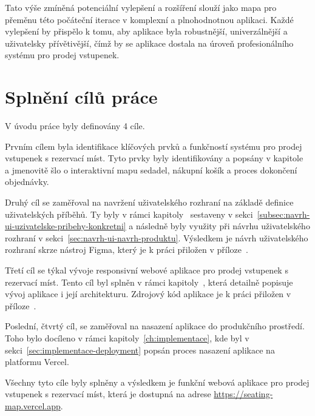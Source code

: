 Tato výše zmíněná potenciální vylepšení a rozšíření slouží jako mapa pro přeměnu této počáteční iterace v komplexní a plnohodnotnou aplikaci.
Každé vylepšení by přispělo k tomu, aby aplikace byla robustnější, univerzálnější a uživatelsky přívětivější, čímž by se aplikace dostala na úroveň profesionálního systému pro prodej vstupenek.


\section*{Splnění cílů práce}
\label{sec:zaver-cile}
V úvodu práce byly definovány 4 cíle.

Prvním cílem byla identifikace klíčových prvků a funkčností systému pro prodej vstupenek s rezervací míst.
Tyto prvky byly identifikovány a popsány v kapitole~ a jmenovitě šlo o interaktivní mapu sedadel, nákupní košík a proces dokončení objednávky.

Druhý cíl se zaměřoval na navržení uživatelského rozhraní na základě definice uživatelských příběhů.
Ty byly v rámci kapitoly~ sestaveny v sekci~\ref{subsec:navrh-ui-uzivatelske-pribehy-konkretni} a následně byly využity při návrhu uživatelského rozhraní v sekci~\ref{sec:navrh-ui-navrh-produktu}.
Výsledkem je návrh uživatelského rozhraní skrze nástroj Figma, který je k práci přiložen v příloze~.

Třetí cíl se týkal vývoje responsivní webové aplikace pro prodej vstupenek s rezervací míst.
Tento cíl byl splněn v rámci kapitoly~, která detailně popisuje vývoj aplikace i její architekturu.
Zdrojový kód aplikace je k práci přiložen v příloze~.

Poslední, čtvrtý cíl, se zaměřoval na nasazení aplikace do produkčního prostředí.
Toho bylo docíleno v rámci kapitoly~\ref{ch:implementace}, kde byl v sekci~\ref{sec:implementace-deployment} popsán proces nasazení aplikace na platformu Vercel.

Všechny tyto cíle byly splněny a výsledkem je funkční webová aplikace pro prodej vstupenek s rezervací míst, která je dostupná na adrese \url{https://seating-map.vercel.app}.


